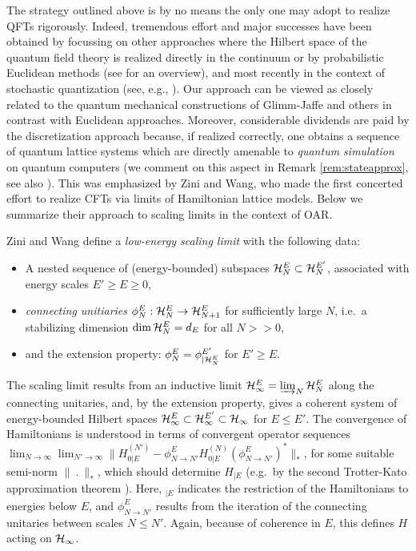 \documentclass[a4paper, 11pt]{article}
\DeclareMathOperator{\1}{\mathds{1}}
\begin{document}
The strategy outlined above is by no means the only one may adopt to realize QFTs rigorously. Indeed, tremendous effort and major successes have been obtained by focussing on other approaches where the Hilbert space of the quantum field theory is realized directly in the continuum or by probabilistic Euclidean methods (see \cite{SummersAPerspectiveOn} for an overview), and most recently in the context of stochastic quantization (see, e.g., \cite{GubinelliAPDEConstruction, HairerATheoryOf}). Our approach can be viewed as closely related to the quantum mechanical constructions of Glimm-Jaffe and others \cite{GlimmJaffe1, GlimmJaffe2, GlimmQuantumFieldTheory} in contrast with Euclidean approaches. Moreover, considerable dividends are paid by the discretization approach because, if realized correctly, one obtains a sequence of quantum lattice systems which are directly amenable to \emph{quantum simulation} on quantum computers (we comment on this aspect in Remark \ref{rem:stateapprox}, see also \cite{OsborneCFTsim}). This was emphasized by Zini and Wang, who made the first concerted effort to realize CFTs via limits of Hamiltonian lattice models. Below we summarize their approach to scaling limits in the context of OAR.

\bigskip

Zini and Wang \cite{ZiniConformalFieldTheories} define a \emph{low-energy scaling limit} with the following data:
\begin{itemize}
	\item A nested sequence of (energy-bounded) subspaces $\mathcal{H}^{E}_{N}\subset\mathcal{H}^{E'}_{N}$, associated with energy scales $E'\geq E\geq0$,
	\item \emph{connecting unitiaries} $\phi^{E}_{N}:\mathcal{H}^{E}_{N}\rightarrow\mathcal{H}^{E}_{N+1}$ for sufficiently large $N$, i.e.~a stabilizing dimension $\dim\mathcal{H}^{E}_{N} = d_{E}$ for all $N>>0$,
	\item and the extension property: $\phi^{E}_{N} = \phi^{E'}_{|\mathcal{H}^{E}_{N}}$ for $E'\geq E$.
\end{itemize}
The scaling limit results from an inductive limit $\mathcal{H}^{E}_{\infty}=\varinjlim_{N}\mathcal{H}^{E}_{N}$ along the connecting unitaries, and, by the extension property, gives a coherent system of energy-bounded Hilbert spaces $\mathcal{H}^{E}_{\infty}\subset\mathcal{H}^{E'}_{\infty}\subset\mathcal{H}_{\infty}$ for $E\leq E'$. The convergence of Hamiltonians is understood in terms of convergent operator sequences $\lim_{N\rightarrow\infty}\lim_{N'\rightarrow\infty}\|H^{(N')}_{0|E}-\phi^{E}_{N\rightarrow N'}H^{(N)}_{0|E}(\phi^{E}_{N\rightarrow N'})^{*}\|_{*}$, for some suitable semi-norm $\|\!\ .\!\ \|_{*}$, which should determine $H_{|E}$ (e.g.~by the second Trotter-Kato approximation theorem \cite{ReedMethodsOfModern1}). Here, $_{|E}$ indicates the restriction of the Hamiltonians to energies below $E$, and $\phi^{E}_{N\rightarrow N'}$ results from the iteration of the connecting unitaries between scales $N\leq N'$. Again, because of coherence in $E$, this defines $H$ acting on $\mathcal{H}_{\infty}$.
\end{document}
